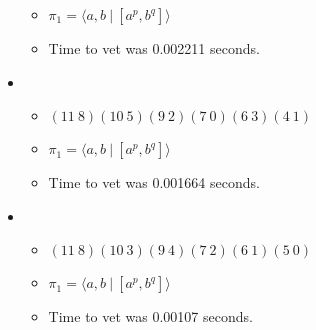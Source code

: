 \documentclass{article}
\begin{document}
\begin{itemize}
\begin{itemize}
      \item $\pi_1 = \langle a,b\ |\ [a^p,b^q]\rangle$
      \item Time to vet was 0.002211 seconds.
\end{itemize}
\item \begin{itemize}
      \item $(11\ 8)(10\ 5)(9\ 2)(7\ 0)(6\ 3)(4\ 1)$
      \item $\pi_1 = \langle a,b\ |\ [a^p,b^q]\rangle$
      \item Time to vet was 0.001664 seconds.
\end{itemize}
\item \begin{itemize}
      \item $(11\ 8)(10\ 3)(9\ 4)(7\ 2)(6\ 1)(5\ 0)$
      \item $\pi_1 = \langle a,b\ |\ [a^p,b^q]\rangle$
      \item Time to vet was 0.00107 seconds.
\end{itemize}
\end{itemize}
\end{document}
